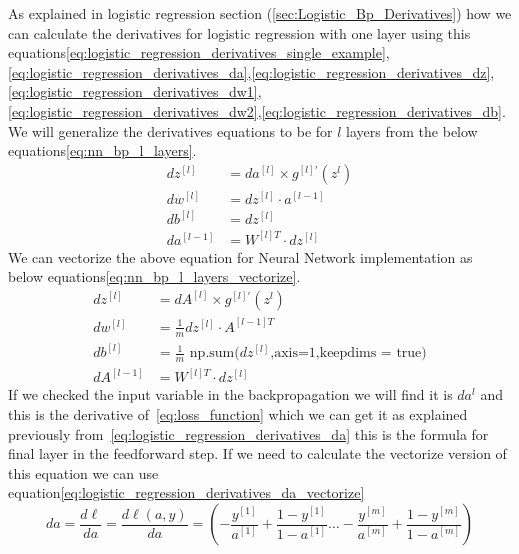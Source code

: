 As explained in logistic regression section (\ref{sec:Logistic_Bp_Derivatives}) how we can calculate the derivatives for logistic regression with one layer using this equations\eqref{eq:logistic_regression_derivatives_single_example},\eqref{eq:logistic_regression_derivatives_da},\eqref{eq:logistic_regression_derivatives_dz},\\
\eqref{eq:logistic_regression_derivatives_dw1},\eqref{eq:logistic_regression_derivatives_dw2},\eqref{eq:logistic_regression_derivatives_db}.\\
We will generalize the derivatives equations to be for $l$ layers from the below equations\eqref{eq:nn_bp_l_layers}.%
 \begin{subequations}\label{eq:nn_bp_l_layers}
   \begin{align}
     dz^{[l]} & = da^{[l]} \times g^{[l]'}(z^{l}) \\
     dw^{[l]} & = dz^{[l]} \cdot a^{[l-1]} \\
     db^{[l]} & = dz^{[l]} \\
     da^{[l-1]} & = W^{[l]T} \cdot dz^{[l]} %
 \end{align}
\end{subequations}%
We can vectorize the above equation for Neural Network implementation as below equations\eqref{eq:nn_bp_l_layers_vectorize}.%
 \begin{subequations}\label{eq:nn_bp_l_layers_vectorize}
   \begin{align}
     dz^{[l]} & = dA^{[l]} \times g^{[l]'}(z^{l}) \\
     dw^{[l]} & = \frac{1}{m} dz^{[l]} \cdot A^{[l-1]T} \\
     db^{[l]} & = \frac{1}{m} \text{ np.sum(}dz^{[l]}\text{,axis=1,keepdims = true)} \\
     dA^{[l-1]} & = W^{[l]T} \cdot dz^{[l]} %
 \end{align}
\end{subequations}%
If we checked the input variable in the backpropagation we will find it is $da^{l}$ and this is the derivative of~\eqref{eq:loss_function} which we can get it as explained previously from~\eqref{eq:logistic_regression_derivatives_da} this is the formula for final layer in the feedforward step. If we need to calculate the vectorize version of this equation we can use equation\eqref{eq:logistic_regression_derivatives_da_vectorize}%
 \begin{equation}\label{eq:logistic_regression_derivatives_da_vectorize}
      da =  \frac{d\ell}{da} = \frac{d\ell(a,y)}{da} = (- \frac{y^{[1]}}{a^{[1]}} + \frac{1-y^{[1]}}{1-a^{[1]}} \ldots - \frac{y^{[m]}}{a^{[m]}} + \frac{1-y^{[m]}}{1-a^{[m]}} )
  \end{equation}%

